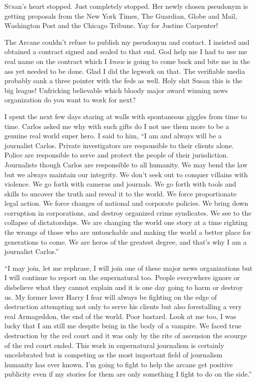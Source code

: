 \lettrine[lines=2,lraise=0]{S}usan's heart stopped. Just completely stopped. Her newly chosen pseudonym is getting proposals from the New York Times, The Guardian, Globe and Mail, Washington Post and the Chicago Tribune. Yay for Justine Carpenter!

The Arcane couldn't refuse to publish my pseudonym and contact. I insisted and obtained a contract signed and sealed to that end. God help me I had to use me real name on the contract which I \textit {know} \space is going to come back and bite me in the ass yet needed to be done. Glad I did the legwork on that. The verifiable media probably sank a three pointer with the feds as well. Holy shit Susan this is the big league! Unfricking believable which bloody major award winning news organization do you want to work for next?

I spent the next few days staring at walls with spontaneous giggles from time to time. Carlos asked me why with such gifts do I not use them more to be a genuine real world super hero. I said to him, ``I am and always will be a journalist Carlos. Private investigators are responsible to their clients alone. Police are responsible to serve and protect the people of their jurisdiction. Journalists though Carlos are responsible to all humanity. We may bend the law but we always maintain our integrity. We don't seek out to conquer villains with violence. We go forth with cameras and journals. We go forth with tools and skills to uncover the truth and reveal it to the world. We force proportionate legal action. We force changes of national and corporate policies. We bring down corruption in corporations, and destroy organized crime syndicates. We see to the collapse of dictatorships. We are changing the world one story at a time righting the wrongs of those who are untouchable and making the world a better place for generations to come. We are heros of the greatest degree, and that's why I am a journalist Carlos.''

``I may join, let me rephrase, I will join one of these major news organizations but I will continue to report on the supernatural too. People everywhere ignore or disbelieve what they cannot explain and it is one day going to harm or destroy us. My former lover Harry I fear will always be fighting on the edge of destruction attempting not only to serve his clients but also forestalling a very real Armageddon, the end of the world. Poor bastard. Look at me too, I was lucky that I am still me despite being in the body of a vampire. We faced true destruction by the red court and it was only by the rite of ascension the scourge of the red court ended. This work in supernatural journalism is certainly uncelebrated but is competing as the most important field of journalism humanity has ever known. I'm going to fight to help the arcane get positive publicity even if my stories for them are only something I fight to do on the side.''

